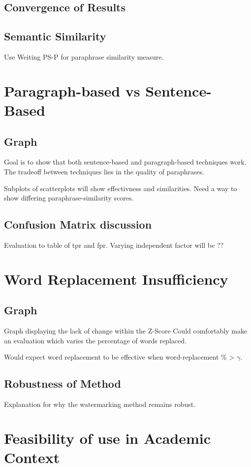 \documentclass{l4proj}
\theoremstyle{definition}
\begin{document}
    \subsection{Convergence of Results}
    \subsection{Semantic Similarity}
        Use Weiting PS-P for paraphrase similarity measure. \citep{wieting2021paraphrastic}
\section{Paragraph-based vs Sentence-Based}
    \subsection{Graph}
        Goal is to show that both sentence-based and paragraph-based techniques work. The tradeoff between techniques lies in the quality of paraphrases.

        Subplots of scatterplots will show effectivness and similarities.
        Need a way to show differing paraphrase-similarity scores.
    \subsection{Confusion Matrix discussion}
        Evaluation to table of tpr and fpr. Varying independent factor will be ??
\section{Word Replacement Insufficiency}
    
    \subsection{Graph}
        Graph displaying the lack of change within the Z-Score
        Could comfortably make an evaluation which varies the percentage of words replaced.

        Would expect word replacement to be effective when word-replacement \% > $\gamma$. 
    \subsection{Robustness of Method}
        Explanation for why the watermarking method remains robust.
\section{Feasibility of use in Academic Context}
\end{document}
